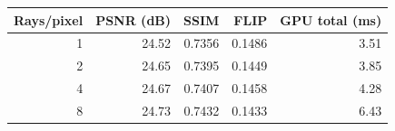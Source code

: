 \begin{tabular}{@{}rrrrr@{}}
\toprule
Rays/pixel & PSNR (dB) & SSIM & FLIP & GPU total (ms) \\
\midrule
1 & 24.52 & 0.7356 & 0.1486 & 3.51 \\
2 & 24.65 & 0.7395 & 0.1449 & 3.85 \\
4 & 24.67 & 0.7407 & 0.1458 & 4.28 \\
8 & 24.73 & 0.7432 & 0.1433 & 6.43 \\
\bottomrule
\end{tabular}
